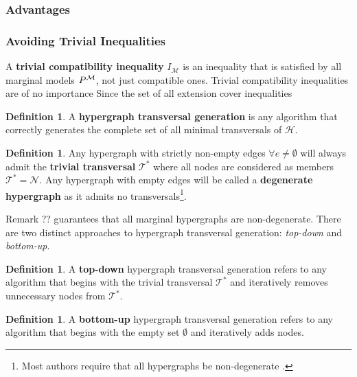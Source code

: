 \documentclass[aps, 10pt, english, twoside, pra, nofootinbib, longbibliography]{revtex4-1}
\theoremstyle{plain}
\theoremstyle{definition}
\newtheorem{definition}[theorem]{Definition}
\theoremstyle{remark}
\newcommand{\nodes}{\mathcal{N}}
\newcommand{\trans}{\mathcal{T}}
\newcommand{\mscenario}{\mathcal{M}}
\newcommand{\term}[1]{\textcolor{Mahogany}{\textbf{#1}}}
\begin{document}
    \subsubsection{Advantages}


    \subsubsection{Avoiding Trivial Inequalities}
    A \term{trivial compatibility inequality} $I_{\mscenario}$ is an inequality that is satisfied by all marginal models $\prob^{\mscenario}$, not just compatible ones. Trivial compatibility inequalities are of no importance Since the set of all extension cover inequalities

    \begin{definition}
        A \term{hypergraph transversal generation} is any algorithm that correctly generates the complete set of all minimal transversals of $\mathcal{H}$.
    \end{definition}

    \begin{definition}
        Any hypergraph with strictly non-empty edges $\forall e \neq \emptyset$ will always admit the \term{trivial transversal} $\trans^*$ where all nodes are considered as members $\trans^* = \nodes$. Any hypergraph with empty edges will be called a \term{degenerate hypergraph} as it admits no transversals\footnote{Most authors require that all hypergraphs be non-degenerate \cite{Kavvadias_2005}.}.
    \end{definition}
    Remark ?? guarantees that all marginal hypergraphs are non-degenerate. There are two distinct approaches to hypergraph transversal generation: \textit{top-down} and \textit{bottom-up}.
    \begin{definition}
        A \term{top-down} hypergraph transversal generation refers to any algorithm that begins with the trivial transversal $\trans^*$ and iteratively removes unnecessary nodes from $\trans^*$.
    \end{definition}

    \begin{definition}
        A \term{bottom-up} hypergraph transversal generation refers to any algorithm that begins with the empty set $\emptyset$ and iteratively adds nodes.
    \end{definition}
\end{document}
